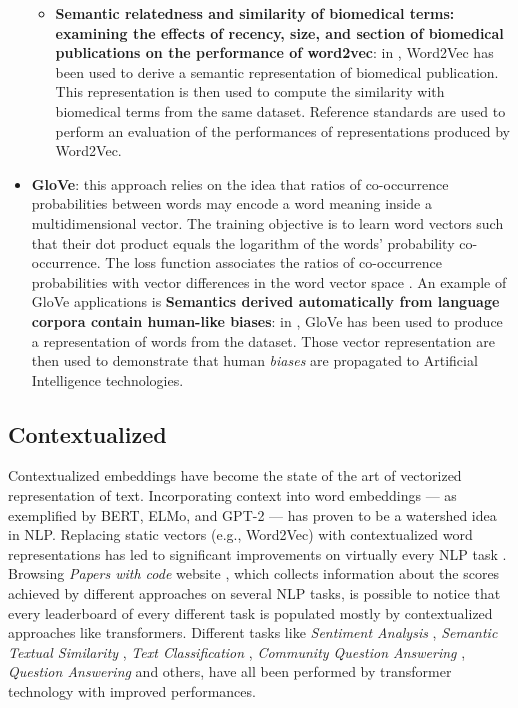 \documentclass[\main/main.tex]{subfiles}
\begin{document}
\begin{itemize}
\begin{itemize}
\begin{itemize}
        \end{itemize}
        \item \textbf{Semantic relatedness and similarity of biomedical terms: examining the effects of recency, size, and section of biomedical publications on the performance of word2vec}: in \cite{Zhu2017SemanticRA}, Word2Vec has been used to derive a semantic representation of biomedical publication. This representation is then used to compute the similarity with biomedical terms from the same dataset. Reference standards are used to perform an evaluation of the performances of representations produced by Word2Vec.  
    \end{itemize}
    
    \item \textbf{GloVe}: this approach relies on the idea that ratios of co-occurrence probabilities between words may encode a word meaning inside a multidimensional vector. The training objective is to learn word vectors such that their dot product equals the logarithm of the words' probability co-occurrence. The loss function associates the ratios of co-occurrence probabilities with vector differences in the word vector space \cite{pennington2014glove}.
    An example of GloVe applications is \textbf{Semantics derived automatically from language corpora contain human-like biases}: in  \cite{Caliskan2017SemanticsDA}, GloVe has been used to produce a representation of words from the dataset. Those vector representation are then used to demonstrate that human \emph{biases} are propagated to Artificial Intelligence technologies.
\end{itemize}
\subsection{Contextualized}
Contextualized embeddings have become the state of the art of vectorized representation of text. Incorporating context into word embeddings --- as exemplified by BERT, ELMo, and GPT-2 --- has proven to be a watershed idea in NLP. Replacing static vectors (e.g., Word2Vec) with contextualized word representations has led to significant improvements on virtually every NLP task \cite{stanford_contextualized_blog_post}. Browsing \emph{Papers with code} website \cite{paperswithcode}, which collects information about the scores achieved by different approaches on several NLP tasks, is possible to notice that every leaderboard of every different task is populated mostly by contextualized approaches like transformers. Different tasks like \emph{Sentiment Analysis} \cite{paperswithcode_sa}, \emph{Semantic Textual Similarity} \cite{paperswithcode_sts}, \emph{Text Classification} \cite{paperswithcode_tc}, \emph{Community Question Answering} \cite{paperswithcode_cqa}, \emph{Question Answering} \cite{paperswithcode_qa} and others, have all been performed by transformer technology with improved performances.
\end{document}
